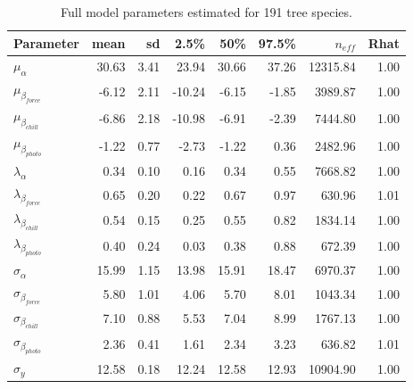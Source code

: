\documentclass[11pt]{article}
\begin{document}
\begin{table}[ht]
\centering
\caption{Full model parameters estimated for 191 tree species.} 
\label{tab:modelanglamb}
\begingroup\footnotesize
\begin{tabular}{lrrrrrrr}
  \hline
Parameter & mean & sd & 2.5\% & 50\% & 97.5\% & $n_{eff}$ & Rhat \\ 
  \hline
$\mu_{\alpha}$ & 30.63 & 3.41 & 23.94 & 30.66 & 37.26 & 12315.84 & 1.00 \\ 
  $\mu_{\beta_{force}}$ & -6.12 & 2.11 & -10.24 & -6.15 & -1.85 & 3989.87 & 1.00 \\ 
  $\mu_{\beta_{chill}}$ & -6.86 & 2.18 & -10.98 & -6.91 & -2.39 & 7444.80 & 1.00 \\ 
  $\mu_{\beta_{photo}}$ & -1.22 & 0.77 & -2.73 & -1.22 & 0.36 & 2482.96 & 1.00 \\ 
  $\lambda_{\alpha}$ & 0.34 & 0.10 & 0.16 & 0.34 & 0.55 & 7668.82 & 1.00 \\ 
  $\lambda_{\beta_{force}}$ & 0.65 & 0.20 & 0.22 & 0.67 & 0.97 & 630.96 & 1.01 \\ 
  $\lambda_{\beta_{chill}}$ & 0.54 & 0.15 & 0.25 & 0.55 & 0.82 & 1834.14 & 1.00 \\ 
  $\lambda_{\beta_{photo}}$ & 0.40 & 0.24 & 0.03 & 0.38 & 0.88 & 672.39 & 1.00 \\ 
  $\sigma_{\alpha}$ & 15.99 & 1.15 & 13.98 & 15.91 & 18.47 & 6970.37 & 1.00 \\ 
  $\sigma_{\beta_{force}}$ & 5.80 & 1.01 & 4.06 & 5.70 & 8.01 & 1043.34 & 1.00 \\ 
  $\sigma_{\beta_{chill}}$ & 7.10 & 0.88 & 5.53 & 7.04 & 8.99 & 1767.13 & 1.00 \\ 
  $\sigma_{\beta_{photo}}$ & 2.36 & 0.41 & 1.61 & 2.34 & 3.23 & 636.82 & 1.01 \\ 
  $\sigma_y$ & 12.58 & 0.18 & 12.24 & 12.58 & 12.93 & 10904.90 & 1.00 \\ 
  \end{tabular}
\endgroup
\end{table} \clearpage \pagebreak 
\end{document}
